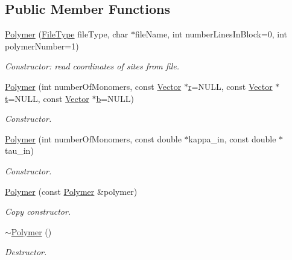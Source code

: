 \subsection*{Public Member Functions}
\begin{DoxyCompactItemize}
\item 
\hyperlink{class_p_c_a_1_1_polymer_ac835d908dc32b787ca80f26cd0e6c68b}{Polymer} (\hyperlink{class_p_c_a_1_1_polymer_a1df36a764fbf04ccd5cbe8edb49d43bd}{File\+Type} file\+Type, char $\ast$file\+Name, int number\+Lines\+In\+Block=0, int polymer\+Number=1)
\begin{DoxyCompactList}\small\item\em Constructor\+: read coordinates of sites from file. \end{DoxyCompactList}\item 
\hyperlink{class_p_c_a_1_1_polymer_ac2645c33eba98a8ec1670d69b92060c8}{Polymer} (int number\+Of\+Monomers, const \hyperlink{class_p_c_a_1_1_vector}{Vector} $\ast$\hyperlink{class_p_c_a_1_1_polymer_a9822e3b9c3420a04a689706b84e586ca}{r}=N\+U\+LL, const \hyperlink{class_p_c_a_1_1_vector}{Vector} $\ast$\hyperlink{class_p_c_a_1_1_polymer_a0fd79e19a8c09a9e4c72903924151b5e}{t}=N\+U\+LL, const \hyperlink{class_p_c_a_1_1_vector}{Vector} $\ast$\hyperlink{class_p_c_a_1_1_polymer_ad93199b0187ab557476153b204b921c7}{b}=N\+U\+LL)
\begin{DoxyCompactList}\small\item\em Constructor. \end{DoxyCompactList}\item 
\hyperlink{class_p_c_a_1_1_polymer_a7d08722028cd9bf11b042a1b3b0e1d37}{Polymer} (int number\+Of\+Monomers, const double $\ast$kappa\+\_\+in, const double $\ast$tau\+\_\+in)
\begin{DoxyCompactList}\small\item\em Constructor. \end{DoxyCompactList}\item 
\hyperlink{class_p_c_a_1_1_polymer_a1ce99540db06e9e48392423ba516cd2f}{Polymer} (const \hyperlink{class_p_c_a_1_1_polymer}{Polymer} \&polymer)
\begin{DoxyCompactList}\small\item\em Copy constructor. \end{DoxyCompactList}\item 
\hyperlink{class_p_c_a_1_1_polymer_ac0d31fa5c6bee720f8069805d6669606}{$\sim$\+Polymer} ()
\begin{DoxyCompactList}\small\item\em Destructor. \end{DoxyCompactList}\item 

\end{DoxyCompactItemize}
